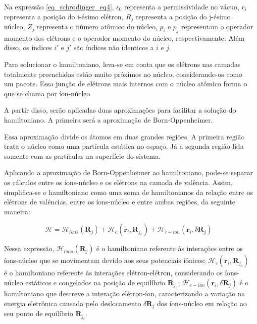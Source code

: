 \documentclass[11pt]{article}
\numberwithin{equation}{section}
\begin{document}
      \par Na expressão \eqref{eq_schrodinger_eq4}, $\epsilon_{0}$ representa a permissividade no vácuo, $r_{i}$ representa a posição do i-ésimo elétron, $R_{j}$ representa a posição do j-ésimo núcleo, $Z_{j}$ representa o número atômico do núcleo, $p_{i}$ e $p_{j}$ representam o operador momento dos elétrons e o operador momento do núcleo, respectivamente. Além disso, os índices $i'$ e $j'$ são índices não identicos a $i$ e $j$.

      \par Para solucionar o hamiltoniano, leva-se em conta que os elétrons nas camadas totalmente preenchidas estão muito próximos ao núcleo, considerando-os como um pacote. Essa junção de elétrons mais internos com o núcleo atômico forma o que se chama por íon-núcleo.
    
      \par A partir disso, serão aplicadas duas aproximações para facilitar a solução do hamiltoniano. A primeira será a aproximação de Born-Oppenheimer.


      \par Essa aproximação divide os átomos em duas grandes regiões. A primeira região trata o núcleo como uma partícula estática no espaço. Já a segunda região lida somente com as partículas na superfície do sistema.

      \par Aplicando a aproximação de Born-Oppenheimer ao hamiltoniano, pode-se separar os cálculos entre os íons-núcleo e os elétrons na camada de valência. Assim, simplifica-se o hamiltoniano como uma soma de hamiltonianos da relação entre os elétrons de valências, entre os íons-núcleo e entre ambas regiões, da seguinte maneira:

      \begin{equation}\label{eq_schrodinger_eq5}
        \mathcal{H} = 
          \mathcal{H}_{ions} (\mathbf{R}_{j}) 
          + \mathcal{H}_{e}(\mathbf{r}_{i}, \mathbf{R}_{j_{0}})
          + \mathcal{H}_{e-ion}(\mathbf{r}_i, \delta\mathbf{R}_j)
      \end{equation}

      \par Nessa expressão, $\mathcal{H}_{ions}(\mathbf{R}_{j})$ é o hamiltoniano referente às interações entre os íons-núcleo que se movimentam devido aos seus potenciais iônicos; $\mathcal{H}_{e}(\mathbf{r}_{i},\mathbf{R}_{j_{0}})$ é o hamiltoniano referente às interações elétron-elétron, considerando os íons-núcleo estáticos e congelados na posição de equilíbrio $\mathbf{R}_{j_{0}}$; $\mathcal{H}_{e-ion}(\mathbf{r}_{i},\delta\mathbf{R}_{j})$ é o hamiltoniano que descreve a interação elétron-íon, caracterizando a variação na energia eletrônica causada pelo deslocamento $\delta\mathbf{R}_{j}$ dos íons-núcleo em relação ao seu ponto de equilíbrio $\mathbf{R}_{j_{0}}$.
      
\end{document}
